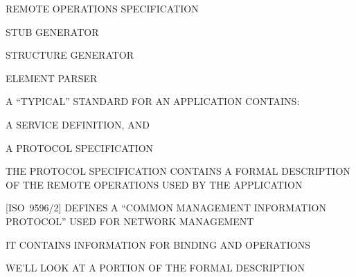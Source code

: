 
\begin{bwslide}
\bf

\begin{nrtc}
\item	REMOTE OPERATIONS SPECIFICATION

\item	STUB GENERATOR

\item	STRUCTURE GENERATOR

\item	ELEMENT PARSER
\end{nrtc}
\end{bwslide}


%




\begin{bwslide}

\begin{nrtc}
\item	A ``TYPICAL'' STANDARD FOR AN APPLICATION CONTAINS:
    \begin{nrtc}
    \item	A SERVICE DEFINITION, AND

    \item	A PROTOCOL SPECIFICATION
    \end{nrtc}

\item	THE PROTOCOL SPECIFICATION CONTAINS A FORMAL DESCRIPTION OF THE REMOTE
OPERATIONS USED BY THE APPLICATION
\end{nrtc}
\end{bwslide}


\begin{bwslide}

\begin{nrtc}
\item	{}[ISO~9596/2] DEFINES A ``COMMON MANAGEMENT INFORMATION PROTOCOL''
	USED FOR NETWORK MANAGEMENT

\item	IT CONTAINS INFORMATION FOR BINDING AND OPERATIONS

\item	WE'LL LOOK AT A PORTION OF THE FORMAL DESCRIPTION
\end{nrtc}
\end{bwslide}


